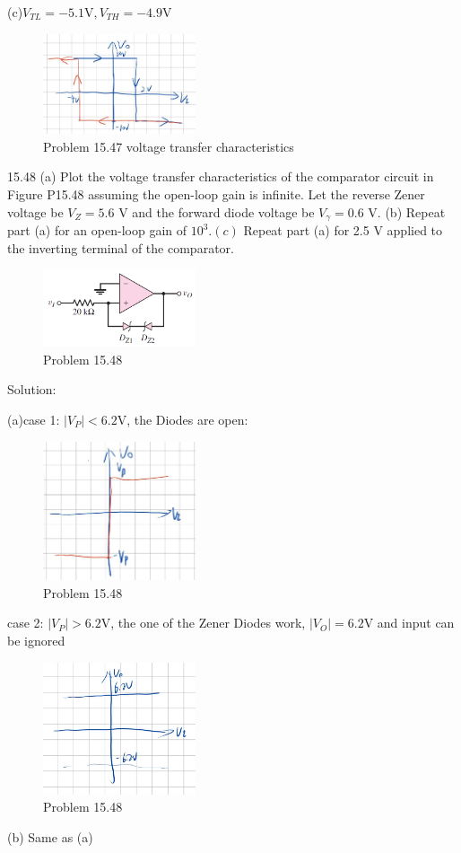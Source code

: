 \documentclass[a4paper,11pt,UTF8]{afthesis}
\begin{document}
(c)$V_{TL}=-5.1\mathrm{V},V_{TH}=-4.9\mathrm{V}$
\begin{figure}[H]
	\centering
	\includegraphics[width=0.4\textwidth]{15.47_1}
	\caption{Problem 15.47 voltage transfer characteristics}
\end{figure}
15.48 (a) Plot the voltage transfer characteristics of the comparator circuit in Figure P15.48 assuming the open-loop gain is infinite. Let the reverse Zener voltage be $V_{Z}=5.6$ V and the forward diode voltage be $V_{\gamma}=0.6$ V. (b) Repeat part (a) for an open-loop gain of $10^3.(c)$ Repeat part (a) for 2.5 V
applied to the inverting terminal of the comparator.
\begin{figure}[H]
	\centering
	\includegraphics[width=0.4\textwidth]{15.48}
	\caption{Problem 15.48}
\end{figure}
\noindent Solution:

(a)case 1: $|V_P|<6.2$V, the Diodes are open:
\begin{figure}[H]
	\centering
	\includegraphics[width=0.4\textwidth]{15.48_1}
	\caption{Problem 15.48}
\end{figure}
case 2: $|V_P|>6.2$V, the one of the Zener Diodes work, $|V_O|=6.2$V and input can be ignored
\begin{figure}[H]
	\centering
	\includegraphics[width=0.4\textwidth]{15.48_2}
	\caption{Problem 15.48}
\end{figure}
(b) Same as (a)
\end{document}
